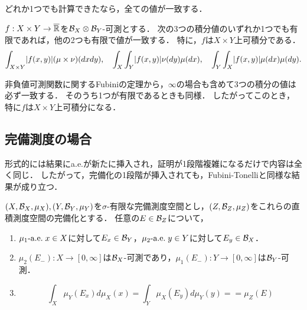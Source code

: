 \documentclass[uplatex, dvipdfmx]{jsreport}
\begin{document}
\begin{tcolorbox}[colframe=ForestGreen, colback=ForestGreen!10!white,breakable,colbacktitle=ForestGreen!40!white,coltitle=black,fonttitle=\bfseries\sffamily,
title=]
    どれか1つでも計算できたなら，全ての値が一致する．
\end{tcolorbox}

\begin{theorem}
    $f:X\times Y\to\overline{\mathbb{R}}$を$\mathcal{B}_X\otimes\mathcal{B}_Y$-可測とする．
    次の3つの積分値のいずれか1つでも有限であれば，他の2つも有限で値が一致する．
    特に，$f$は$X\times Y$上可積分である．
    \[\int_{X\times Y}\lvert f(x,y)\rvert(\mu\times\nu)(dxdy),\quad\int_X\int_Y\lvert f(x,y)\rvert\nu(dy)\mu(dx),\quad\int_Y\int_X\lvert f(x,y)\rvert\mu(dx)\mu(dy).\]
\end{theorem}
\begin{Proof}
    非負値可測関数に関するFubiniの定理から，$\infty$の場合も含めて3つの積分の値は必ず一致する．
    そのうち1つが有限であるときも同様．
    したがってこのとき，特に$f$は$X\times Y$上可積分になる．
\end{Proof}

\subsection{完備測度の場合}

\begin{tcolorbox}[colframe=ForestGreen, colback=ForestGreen!10!white,breakable,colbacktitle=ForestGreen!40!white,coltitle=black,fonttitle=\bfseries\sffamily,
title=]
    形式的には結果にa.e.が新たに挿入され，証明が1段階複雑になるだけで内容は全く同じ．
    したがって，完備化の1段階が挿入されても，Fubini-Tonelliと同様な結果が成り立つ．
\end{tcolorbox}

\begin{theorem}
    $(X,\mathcal{B}_X,\mu_X),(Y,\mathcal{B}_Y,\mu_Y)$を$\sigma$-有限な完備測度空間とし，$(Z,\mathcal{B}_Z,\mu_Z)$をこれらの直積測度空間の完備化とする．
    任意の$E\in\mathcal{B}_Z$について，
    \begin{enumerate}
        \item $\mu_1\textrm{-a.e.}\; x\in X$に対して$E_x\in\mathcal{B}_Y$，$\mu_2\textrm{-a.e.}\; y\in Y$に対して$E_y\in\mathcal{B}_X$．
        \item $\mu_2(E_-):X\to[0,\infty]$は$\mathcal{B}_X$-可測であり，$\mu_1(E_-):Y\to[0,\infty]$は$\mathcal{B}_Y$-可測．
        \item \[\int_X\mu_Y(E_x)d\mu_X(x)=\int_Y\mu_X(E_y)d\mu_Y(y)==\mu_Z(E)\]
    \end{enumerate}
\end{theorem}
\end{document}
